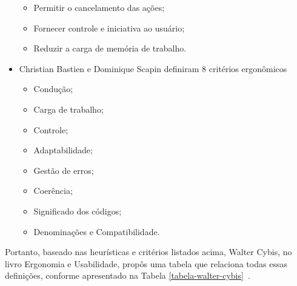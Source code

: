 \begin{itemize}
\begin{itemize}
    \item Permitir o cancelamento das ações;

    \item Fornecer controle e iniciativa ao usuário;

    \item Reduzir a carga de memória de trabalho.

    \end{itemize}

\item Christian Bastien e Dominique Scapin definiram 8 critérios ergonômicos~\cite{bastien1993}

    \begin{itemize}

    \item Condução;

    \item Carga de trabalho;

    \item Controle;

    \item Adaptabilidade;

    \item Gestão de erros;

    \item Coerência;

    \item Significado dos códigos;

    \item Denominações e Compatibilidade.

    \end{itemize}

\end{itemize}

Portanto, baseado nas heurísticas e critérios listados acima,  Walter Cybis, no
livro Ergonomia e Usabilidade, propôs uma tabela que relaciona todas essas
definições, conforme apresentado na Tabela \ref{tabela-walter-cybis}~\cite{cybis2010}.

